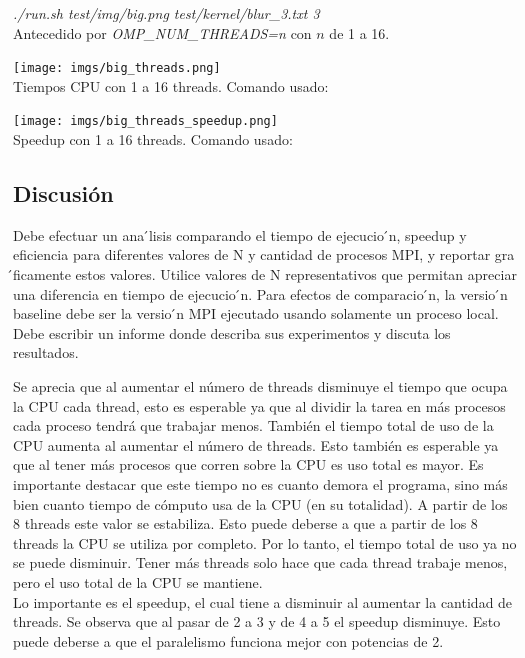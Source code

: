 \documentclass[10pt]{extarticle}
\begin{document}
\textit{./run.sh test/img/big.png test/kernel/blur\_3.txt 3}\\

Antecedido por \textit{OMP\_NUM\_THREADS=n} con $n$ de 1 a 16.\\

\begin{center}
 \texttt{[image: imgs/big\_threads.png]}\\
 \footnotesize{Tiempos CPU con 1 a 16 threads. Comando usado:}\\
\end{center}


\begin{center}
 \texttt{[image: imgs/big\_threads\_speedup.png]}\\
 \footnotesize{Speedup con 1 a 16 threads. Comando usado:}\\
\end{center}

\subsection*{Discusión}
Debe efectuar un ana ́lisis comparando el tiempo de ejecucio ́n, speedup y eficiencia para diferentes valores de N y cantidad de procesos MPI, y reportar gra ́ficamente estos valores. Utilice valores de N representativos que permitan apreciar una diferencia en tiempo de ejecucio ́n.
Para efectos de comparacio ́n, la versio ́n baseline debe ser la versio ́n MPI ejecutado usando solamente un proceso local.
Debe escribir un informe donde describa sus experimentos y discuta los resultados.

Se aprecia que al aumentar el número de threads disminuye el tiempo que ocupa la CPU cada thread, esto es esperable ya que al dividir la tarea en más procesos cada proceso tendrá que trabajar menos. También el tiempo total de uso de la CPU aumenta al aumentar el número de threads. Esto también es esperable ya que al tener más procesos que corren sobre la CPU es uso total es mayor. Es importante destacar que este tiempo no es cuanto demora el programa, sino más bien cuanto tiempo de cómputo usa de la CPU (en su totalidad). A partir de los 8 threads este valor se estabiliza. Esto puede deberse a que a partir de los 8 threads la CPU se utiliza por completo. Por lo tanto, el tiempo total de uso ya no se puede disminuir. Tener más threads solo hace que cada thread trabaje menos, pero el uso total de la CPU se mantiene.\\

Lo importante es el speedup, el cual tiene a disminuir al aumentar la cantidad de threads. Se observa que al pasar de 2 a 3 y de 4 a 5 el speedup disminuye. Esto puede deberse a que el paralelismo funciona mejor con potencias de 2.\\
\end{document}
